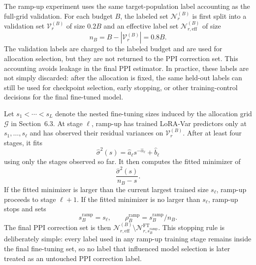 \documentclass[11pt]{article}
\begin{document}
The ramp-up experiment uses the same target-population label accounting as the full-grid
validation. For each budget $B$, the labeled set $\mathcal{N}_r^{(B)}$ is first split into a
validation set $\mathcal{V}_r^{(B)}$ of size $0.2B$ and an effective label set
$\mathcal{N}_{r,\mathrm{eff}}^{(B)}$ of size
\[
    n_B=B-|\mathcal{V}_r^{(B)}|=0.8B .
\]
The validation labels are charged to the labeled budget and are used for allocation selection, but
they are not returned to the PPI correction set. This accounting avoids leakage in the final PPI
estimator. In practice, these labels are not simply discarded: after the allocation is fixed, the
same held-out labels can still be used for checkpoint selection, early stopping, or other
training-control decisions for the final fine-tuned model.

Let $s_1<\cdots<s_L$ denote the nested fine-tuning sizes induced by the allocation grid
$\mathcal{G}$ in Section~6.3. At stage $\ell$, ramp-up has trained LoRA-Var predictors only at
$s_1,\ldots,s_\ell$ and has observed their residual variances on
$\mathcal{V}_r^{(B)}$. After at least four stages, it fits
\[
    \widehat{\sigma}^2(s)=\hat a_\ell s^{-\hat\alpha_\ell}+\hat b_\ell
\]
using only the stages observed so far. It then computes the fitted minimizer of
\[
    \frac{\widehat{\sigma}^2(s)}{n_B-s}.
\]
If the fitted minimizer is larger than the current largest trained size $s_\ell$, ramp-up proceeds
to stage $\ell+1$. If the fitted minimizer is no larger than $s_\ell$, ramp-up stops and sets
\[
    s_B^{\mathrm{ramp}}=s_\ell,
    \qquad
    \rho_B^{\mathrm{ramp}}=s_B^{\mathrm{ramp}}/n_B .
\]
The final PPI correction set is then
$\mathcal{N}_{r,\mathrm{eff}}^{(B)}\setminus\mathcal{N}_{r,s_B^{\mathrm{ramp}}}^{\mathrm{FT}}$.
This stopping rule is deliberately simple: every label used in any ramp-up training stage remains
inside the final fine-tuning set, so no label that influenced model selection is later treated as
an untouched PPI correction label.
\end{document}
